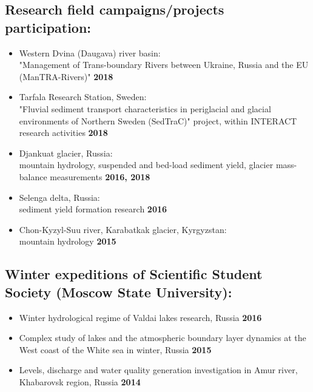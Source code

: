 \documentclass[a4,10pt]{article}
\newenvironment{zitemize}{
\begin{itemize}\itemsep2pt \parskip0pt \parsep1pt}
{\end{itemize}\vspace{-0.5cm}}
\begin{document}
\subsection{Research field campaigns/projects participation:}
    \begin{zitemize}
        \item Western Dvina (Daugava) river basin: \\"Management of Trans-boundary Rivers between Ukraine, Russia and the EU (ManTRA-Rivers)" \hfill \textbf{2018}
        \item Tarfala Research Station, Sweden: \\"Fluvial sediment transport characteristics in periglacial and glacial environments of Northern Sweden (SedTraC)" project, within INTERACT research activities \hfill \textbf{2018}
        \item{Djankuat glacier, Russia: \\ mountain hydrology, suspended and bed-load sediment yield, glacier mass-balance measurements \hfill \textbf{2016, 2018}}
        \item{Selenga delta, Russia: \\ sediment yield formation research \hfill \textbf{2016}}
        \item{Chon-Kyzyl-Suu river, Karabatkak glacier, Kyrgyzstan: \\mountain hydrology \hfill \textbf{2015}}
    \end{zitemize}

\subsection{Winter expeditions of Scientific Student Society (Moscow State University):}
    \begin{zitemize}
        \item Winter hydrological regime of Valdai lakes research, Russia \hfill \textbf{2016}
        \item Complex study of lakes and the atmospheric boundary layer dynamics at the West coast of the White sea in winter, Russia \hfill \textbf{2015}
        \item{Levels, discharge and water quality generation investigation in Amur river, Khabarovsk region, Russia \hfill \textbf{2014}}
    \end{zitemize}


\end{document}
